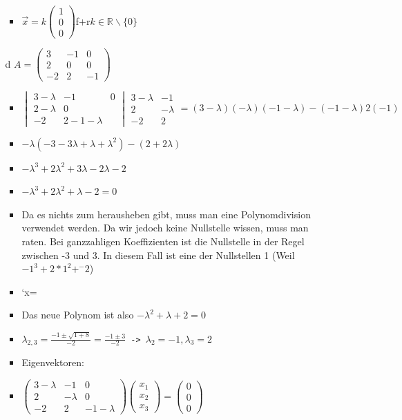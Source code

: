 \documentclass{article}
\newcommand{\R}{\mathbb{R}}
\begin{document}
\begin{itemize}
\begin{itemize}
\begin{itemize}
				\item{$\vec{x}=k \begin{pmatrix} 1 \\ 0 \\ 0 \end{pmatrix}$f+r$k\in\R\backslash\{0\}$}
			\end{itemize}
			\item[d]{$A=\begin{pmatrix} 3 & -1 & 0 \\ 2 & 0 & 0 \\ -2 & 2 & -1 \end{pmatrix}$}
			\begin{itemize}
				\item{$\begin{vmatrix} 3-\lambda & -1 & 0 \\ 2 -\lambda & 0 \\ -2 & 2 -1-\lambda \end{vmatrix}\begin{matrix} 3-\lambda & -1 \\ 2 & -\lambda \\ -2 & 2 \end{matrix}=(3-\lambda)(-\lambda)(-1-\lambda)-(-1-\lambda)2(-1)$}
				\item{$-\lambda(-3-3\lambda+\lambda+\lambda^2)-(2+2\lambda)$}
				\item{$-\lambda^3+2\lambda^2+3\lambda-2\lambda-2$}
				\item{$-\lambda^3+2\lambda^2+\lambda-2=0$}
				\item{Da es nichts zum herausheben gibt, muss man eine Polynomdivision verwendet werden. Da wir jedoch keine Nullstelle wissen, muss man raten. Bei ganzzahligen Koeffizienten ist die Nullstelle in der Regel zwischen -3 und 3. In diesem Fall ist eine der Nullstellen 1 (Weil $-1^3+2*1^2+^-2$)}
				\item{\mathcode`x=\lambda {}}
				\item{Das neue Polynom ist also $-\lambda^2+\lambda+2=0$}
				\item{$\lambda_{2,3}=\frac{-1\pm\sqrt{1+8}}{-2}=\frac{-1\pm3}{-2}$\texttt{ -> }$\lambda_2=-1, \lambda_3=2$}
				\item{Eigenvektoren:}
				\item{$\begin{pmatrix} 3-\lambda & -1 & 0 \\ 2 & -\lambda & 0 \\ -2 & 2 & -1-\lambda \end{pmatrix}\begin{pmatrix} x_1 \\ x_2 \\ x_3 \end{pmatrix}=\begin{pmatrix} 0 \\ 0 \\ 0 \end{pmatrix}$}

\end{itemize}
\end{itemize}
\end{itemize}
\end{document}
